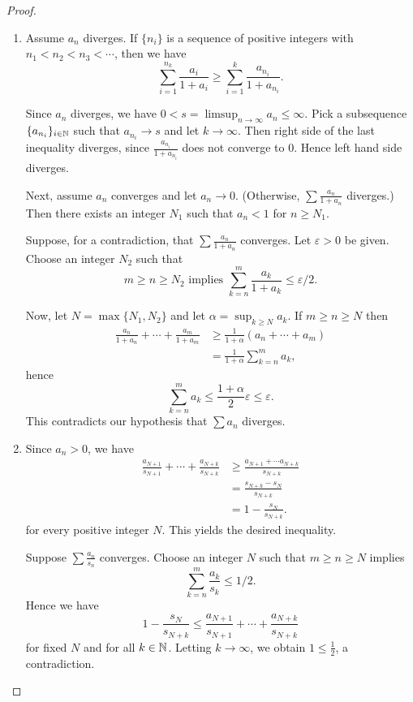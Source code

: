 \begin{proof}
\begin{enumerate}
    \item[(a)] Assume $a_n$ diverges. 
If $\{n_i\}$ is a sequence of positive integers with $n_1<n_2<n_3<\cdots$, then we have
\[
\sum_{i=1}^{n_k} \frac{a_i}{1+a_i} \geq \sum_{i=1}^k \frac{a_{n_i}}{1+a_{n_i}}.
\]

Since $a_n$ diverges, we have $0<s=\limsup_{n \to \infty} a_n \leq \infty$. 
Pick a subsequence $\{a_{n_i}\}_{i \in \mathbb{N}}$ such that $a_{n_i} \to s$ and let $k \to \infty$.
Then right side of the last inequality diverges, since $\frac{a_{n_i}}{1+a_{n_i}}$ does not converge to $0$.
Hence left hand side diverges.

Next, assume $a_n$ converges and let $a_n \to 0$. (Otherwise, $\sum \frac{a_n}{1+a_n}$ diverges.)
Then there exists an integer $N_1$ such that $a_n<1$ for $n \geq N_1$.

Suppose, for a contradiction, that $\sum \frac{a_n}{1+a_n}$ converges.
Let $\varepsilon>0$ be given. 
Choose an integer $N_2$ such that 
\[
m \geq n \geq N_2 \text{ implies } \sum_{k=n}^m\frac{a_k}{1+a_k}  \leq \varepsilon/2.
\]

Now, let $N= \max \{N_1,N_2\}$ and let $\alpha= \sup_{k \geq N} a_k$.
If $m \geq n \geq N$ then
\begin{align*}
    \frac{a_n}{1+a_n}+ \cdots +\frac{a_m}{1+a_m}  &\geq \frac{1}{1+\alpha}(a_n+ \cdots +a_m) \\
    &=\frac{1}{1+\alpha} \sum_{k=n}^m a_k,
\end{align*}
hence 
\[
\sum_{k=n}^m a_k \leq \frac{1+\alpha}{2} \varepsilon \leq \varepsilon.
\]
This contradicts our hypothesis that $\sum a_n$ diverges.

\item[(b)] Since $a_n>0$, we have
\begin{align*}
\frac{a_{N+1}}{s_{N+1}}+ \cdots +\frac{a_{N+k}}{s_{N+k}} &\geq \frac{a_{N+1}+ \cdots a_{N+k}}{s_{N+k}} \\
&=\frac{s_{N+k}-s_N}{s_{N+k}} \\
&= 1-\frac{s_N}{s_{N+k}}.
\end{align*}
for every positive integer $N$.
This yields the desired inequality.

Suppose $\sum \frac{a_n}{s_n}$ converges.
Choose an integer $N$ such that $m \geq n \geq N$ implies 
\[
\sum_{k=n}^m \frac{a_k}{s_k} \leq 1/2.
\]
Hence we have
\[
1-\frac{s_N}{s_{N+k}} \leq \frac{a_{N+1}}{s_{N+1}} + \cdots + \frac{a_{N+k}}{s_{N+k}}
\]
for fixed $N$ and for all $k \in \mathbb{N}$.
Letting $k \to \infty$, we obtain $1 \leq \frac{1}{2}$, a contradiction.


\end{enumerate}
\end{proof}
